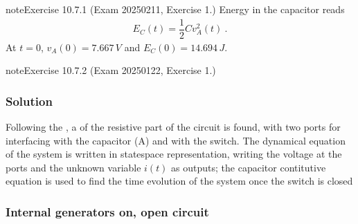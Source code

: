 \documentclass[letterpaper,10pt,italian]{jupyterBook}
\begin{document}
\begin{sphinxadmonition}{note}{Exercise 10.7.1 (Exam 2025\sphinxhyphen{}02\sphinxhyphen{}11, Exercise 1.)}
\sphinxAtStartPar
{} Energy in the capacitor reads
\begin{equation*}
\begin{split}E_C(t) = \dfrac{1}{2} C v_A^2(t) \ .\end{split}
\end{equation*}
\sphinxAtStartPar
At \(t = 0\), \(v_A(0) = 7.667 \, V\) and \(E_C(0) = 14.694 \, J \).
\end{sphinxadmonition}


 \label{exercise:exam-25-01-22-exe-01}

\begin{sphinxadmonition}{note}{Exercise 10.7.2 (Exam 2025\sphinxhyphen{}01\sphinxhyphen{}22, Exercise 1.)}



\begin{figure}[htbp]
\centering

\noindent{}
\end{figure}
\subsubsection*{Solution}

\sphinxAtStartPar
Following the , a {\hyperref[\detokenize{ch/electrical-engineering-networks:classical-electromagnetism-electrical-engineering-newtork-analysis-thevenin-n-port}]{}} of the resistive part of the circuit is found, with two ports for interfacing with the capacitor (A) and with the switch. The dynamical equation of the system is written in state\sphinxhyphen{}space representation, writing the voltage at the ports and the unknown variable \(i(t)\) as outputs; the capacitor contitutive equation is used to find the time evolution of the system once the switch is closed



\begin{figure}[htbp]
\centering

\noindent{}
\end{figure}
\subsubsection*{Internal generators on, open circuit}


\end{sphinxadmonition}
\end{document}
